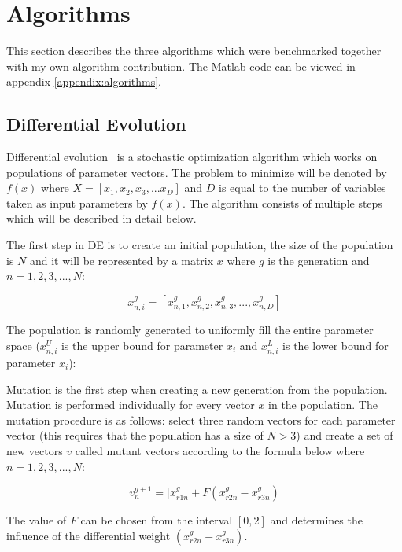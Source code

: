 \section{Algorithms}

This section describes the three algorithms which were benchmarked together with my own algorithm contribution. The Matlab code can be viewed in appendix \ref{appendix:algorithms}.

\subsection{Differential Evolution}

Differential evolution~\cite{Storn1997} is a stochastic optimization algorithm which works on populations of parameter vectors. The problem to minimize will be denoted by $f(x)$ where $X=[x_1,x_2,x_3,...x_D]$ and $D$ is equal to the number of variables taken as input parameters by $f(x)$. The algorithm consists of multiple steps which will be described in detail below.

The first step in DE is to create an initial population, the size of the population is $N$ and it will be represented by a matrix $x$ where $g$ is the generation and $n=1,2,3,...,N$:

\begin{equation}
x_{n,i}^{g} = [ x_{n,1}^{g}, x_{n,2}^{g}, x_{n,3}^{g}, ..., x_{n,D}^{g} ]
\end{equation}

The population is randomly generated to uniformly fill the entire parameter space ($x_{n,i}^U$ is the upper bound for parameter $x_i$ and $x_{n,i}^L$ is the lower bound for parameter $x_i$):

Mutation is the first step when creating a new generation from the population. Mutation is performed individually for every vector $x$ in the population. The mutation procedure is as follows: select three random vectors for each parameter vector (this requires that the population has a size of $N > 3$) and create a set of new vectors $v$ called mutant vectors according to the formula below where $n=1,2,3,...,N$:

\begin{equation}
v_{n}^{g+1} = [ x_{r1n}^{g} + F(x_{r2n}^{g} - x_{r3n}^{g})
\end{equation}

The value of $F$ can be chosen from the interval $[0,2]$ and determines the influence of the differential weight $(x_{r2n}^{g} - x_{r3n}^{g})$.

